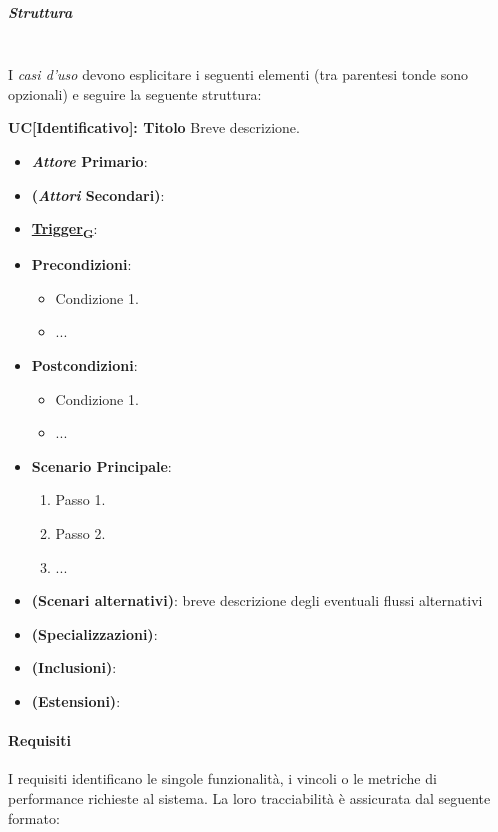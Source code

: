 \documentclass[12pt, a4paper]{article}
\newcommand{\urlglossario}{https://skynetunigroup.github.io/Code_Guardian/Documentazione/PB/glossario_v2.0.0.pdf} %
\newcommand{\glo}[2]{\href{\urlglossario\#nameddest=#2}{#1\textsubscript{G}}}
\begin{document}
\newpage
\subparagraph{Struttura}\mbox{}\\
I \textit{casi d'uso} devono esplicitare i seguenti elementi (tra parentesi tonde sono opzionali) e seguire la seguente struttura: 

\noindent \textbf{UC[Identificativo]: Titolo} \newline
Breve descrizione.
\begin{itemize}
    \item \textbf{\textit{Attore} Primario}:
    \item \textbf{(\textit{Attori} Secondari)}:
    \item \textbf{\glo{Trigger}{trigger}}: 
    \item \textbf{Precondizioni}: 
        \begin{itemize}
            \item Condizione 1.
            \item ...
        \end{itemize}
    \item \textbf{Postcondizioni}: 
        \begin{itemize}
            \item Condizione 1.
            \item ...
        \end{itemize}
    \item \textbf{Scenario Principale}:
        \begin{enumerate}
            \item Passo 1.
            \item Passo 2.
            \item ...
        \end{enumerate}
    \item \textbf{(Scenari alternativi)}:
        breve descrizione degli eventuali flussi alternativi
    \item \textbf{(Specializzazioni)}:
    \item \textbf{(Inclusioni)}:
    \item \textbf{(Estensioni)}:
\end{itemize}
\newpage

\paragraph{Requisiti}
I requisiti identificano le singole funzionalità, i vincoli o le metriche di performance richieste al sistema. La loro tracciabilità è assicurata dal seguente formato:
\end{document}

